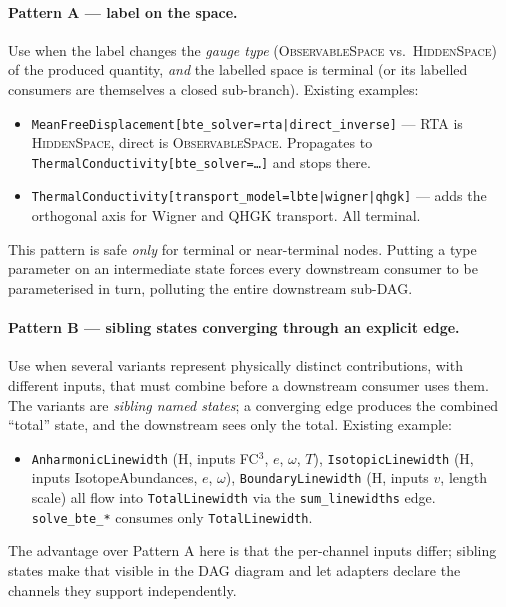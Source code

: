 \documentclass[11pt,a4paper]{article}
\begin{document}
\paragraph{Pattern A --- label on the space.} Use when the label changes the
\emph{gauge type} (\textsc{ObservableSpace} vs.\ \textsc{HiddenSpace}) of the
produced quantity, \emph{and} the labelled space is terminal (or its
labelled consumers are themselves a closed sub-branch). Existing examples:
\begin{itemize}[leftmargin=2em]
  \item \texttt{MeanFreeDisplacement[bte\_solver=rta|direct\_inverse]} ---
        RTA is \textsc{HiddenSpace}, direct is \textsc{ObservableSpace}. Propagates
        to \texttt{ThermalConductivity[bte\_solver=\ldots]} and stops there.
  \item \texttt{ThermalConductivity[transport\_model=lbte|wigner|qhgk]} ---
        adds the orthogonal axis for Wigner and QHGK transport. All terminal.
\end{itemize}
This pattern is safe \emph{only} for terminal or near-terminal nodes. Putting a
type parameter on an intermediate state forces every downstream consumer to be
parameterised in turn, polluting the entire downstream sub-DAG.

\paragraph{Pattern B --- sibling states converging through an explicit edge.}
Use when several variants represent physically distinct contributions, with
different inputs, that must combine before a downstream consumer uses them.
The variants are \emph{sibling named states}; a converging edge produces the
combined ``total'' state, and the downstream sees only the total. Existing
example:
\begin{itemize}[leftmargin=2em]
  \item \texttt{AnharmonicLinewidth} (\textsc{H}, inputs FC$^3$, $e$, $\omega$, $T$),
        \texttt{IsotopicLinewidth} (\textsc{H}, inputs IsotopeAbundances, $e$,
        $\omega$), \texttt{BoundaryLinewidth} (\textsc{H}, inputs $v$, length
        scale) all flow into \texttt{TotalLinewidth} via the
        \texttt{sum\_linewidths} edge. \texttt{solve\_bte\_*} consumes only
        \texttt{TotalLinewidth}.
\end{itemize}
The advantage over Pattern A here is that the per-channel inputs differ;
sibling states make that visible in the DAG diagram and let adapters declare
the channels they support independently.
\end{document}
